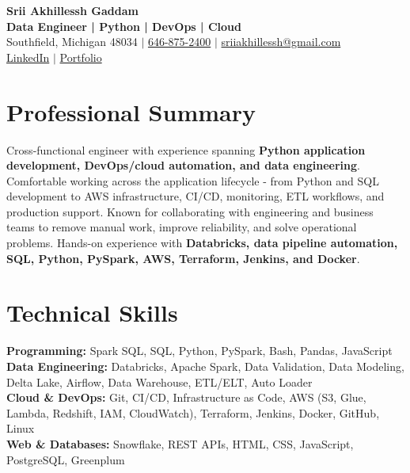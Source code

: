 \documentclass[letterpaper,10pt]{article}
\begin{document}
\fontsize{9.35pt}{10.45pt}\selectfont

\begin{center}
    {\LARGE \textbf{Srii Akhillessh Gaddam}} \\[-1pt]
    \textbf{Data Engineer | Python | DevOps | Cloud} \\[2pt]
    Southfield, Michigan 48034 $|$
    \href{tel:6468752400}{646-875-2400} $|$
    \href{mailto:sriiakhillessh@gmail.com}{sriiakhillessh@gmail.com} \\[1pt]
    \href{https://www.linkedin.com/in/srii-akhiilessh-gaddam-b48668191/}{LinkedIn} $|$
    \href{https://sriiakhillesshg.github.io/portfolio/}{Portfolio}
\end{center}
\vspace{-8pt}

\section{Professional Summary}
\small{Cross-functional engineer with experience spanning \textbf{Python application development, DevOps/cloud automation, and data engineering}. Comfortable working across the application lifecycle - from Python and SQL development to AWS infrastructure, CI/CD, monitoring, ETL workflows, and production support. Known for collaborating with engineering and business teams to remove manual work, improve reliability, and solve operational problems. Hands-on experience with \textbf{Databricks, data pipeline automation, SQL, Python, PySpark, AWS, Terraform, Jenkins, and Docker}.}

\section{Technical Skills}
\small{
\textbf{Programming:} Spark SQL, SQL, Python, PySpark, Bash, Pandas, JavaScript \\
\textbf{Data Engineering:} Databricks, Apache Spark, Data Validation, Data Modeling, Delta Lake, Airflow, Data Warehouse, ETL/ELT, Auto Loader \\
\textbf{Cloud \& DevOps:} Git, CI/CD, Infrastructure as Code, AWS (S3, Glue, Lambda, Redshift, IAM, CloudWatch), Terraform, Jenkins, Docker, GitHub, Linux \\
\textbf{Web \& Databases:} Snowflake, REST APIs, HTML, CSS, JavaScript, PostgreSQL, Greenplum
}
\end{document}
